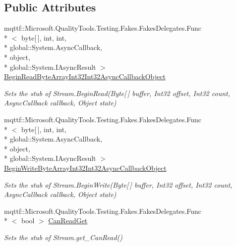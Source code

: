 \subsection*{Public Attributes}
\begin{DoxyCompactItemize}
\item 
mqttf\-::\-Microsoft.\-Quality\-Tools.\-Testing.\-Fakes.\-Fakes\-Delegates.\-Func\\*
$<$ byte\mbox{[}$\,$\mbox{]}, int, int, \\*
global\-::\-System.\-Async\-Callback, \\*
object, \\*
global\-::\-System.\-I\-Async\-Result $>$ \hyperlink{class_system_1_1_i_o_1_1_fakes_1_1_stub_stream_a22625bd32bfcf308f0f3a1948eaec958}{Begin\-Read\-Byte\-Array\-Int32\-Int32\-Async\-Callback\-Object}
\begin{DoxyCompactList}\small\item\em Sets the stub of Stream.\-Begin\-Read(\-Byte\mbox{[}$\,$\mbox{]} buffer, Int32 offset, Int32 count, Async\-Callback callback, Object state)\end{DoxyCompactList}\item 
mqttf\-::\-Microsoft.\-Quality\-Tools.\-Testing.\-Fakes.\-Fakes\-Delegates.\-Func\\*
$<$ byte\mbox{[}$\,$\mbox{]}, int, int, \\*
global\-::\-System.\-Async\-Callback, \\*
object, \\*
global\-::\-System.\-I\-Async\-Result $>$ \hyperlink{class_system_1_1_i_o_1_1_fakes_1_1_stub_stream_ab1674477856779654707f19d1ed060f6}{Begin\-Write\-Byte\-Array\-Int32\-Int32\-Async\-Callback\-Object}
\begin{DoxyCompactList}\small\item\em Sets the stub of Stream.\-Begin\-Write(\-Byte\mbox{[}$\,$\mbox{]} buffer, Int32 offset, Int32 count, Async\-Callback callback, Object state)\end{DoxyCompactList}\item 
mqttf\-::\-Microsoft.\-Quality\-Tools.\-Testing.\-Fakes.\-Fakes\-Delegates.\-Func\\*
$<$ bool $>$ \hyperlink{class_system_1_1_i_o_1_1_fakes_1_1_stub_stream_a7b1ab5cb7f665ce0d52337b539c6d6ba}{Can\-Read\-Get}
\begin{DoxyCompactList}\small\item\em Sets the stub of Stream.\-get\-\_\-\-Can\-Read()\end{DoxyCompactList}\item 

\end{DoxyCompactItemize}
